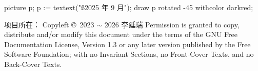 picture p; p := textext("{\ss 2025 年 9 月}");
draw p rotated -45 withcolor darkred;
\stopuniqueMPgraphic
{}

\blank[line]
项目所在：{\tta{}}
\vfill
Copyleft \copyright\  2023 $\sim$ 2026  李延瑞
\blank
Permission is granted to copy, distribute and/or modify this document under the terms of the GNU Free Documentation License, Version 1.3 or any later version published by the Free Software Foundation; with no Invariant Sections, no Front-Cover Texts, and no Back-Cover Texts.
\stopstandardmakeup
\setupbackgrounds[page][background=]
